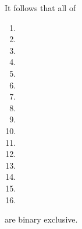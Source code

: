 \saNote{} \label{bls: generalities: flag sum: binary exclusivity}
It follows that all of
\begin{multicols}{2}
	\begin{enumerate}
		\item \isPointEvaluationData{}
		\item \isBlsGOneAddData{}
		\item \isBlsGOneMsmData{}
		\item \isBlsGTwoAddData{}
		\item \isBlsGTwoMsmData{}
		\item \isBlsPairingCheckData{}
		\item \isBlsMapFpToGOneData{}
		\item \isBlsMapFpTwoToGTwoData{}
		\item \isPointEvaluationResult{}
		\item \isBlsGOneAddResult{}
		\item \isBlsGOneMsmResult{}
		\item \isBlsGTwoAddResult{}
		\item \isBlsGTwoMsmResult{}
		\item \isBlsPairingCheckResult{}
		\item \isBlsMapFpToGOneResult{}
		\item \isBlsMapFpTwoToGTwoResult{}
	\end{enumerate}
\end{multicols}
\noindent are binary exclusive.
